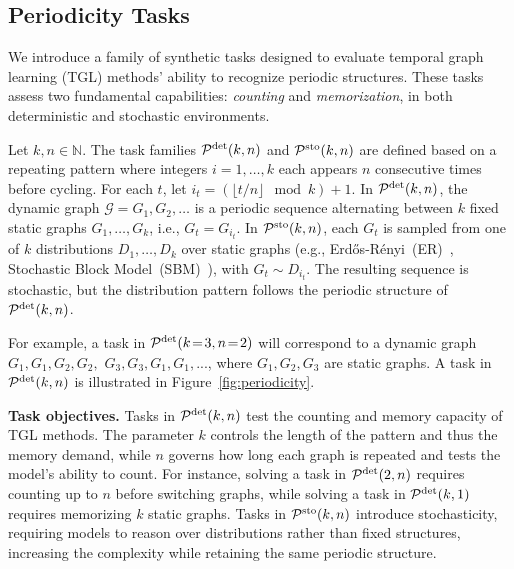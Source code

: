 
\subsection{Periodicity Tasks}\label{synth-benchmark:periodicity}

We introduce a family of synthetic tasks designed to evaluate temporal graph learning (TGL) methods' ability to recognize periodic structures. These tasks assess two fundamental capabilities: \emph{counting} and \emph{memorization}, in both deterministic and stochastic environments.




\begin{definition}
Let $k, n \in \mathbb{N}$. The task families $\mathcal{P}^\text{det}(k,n)$ and $\mathcal{P}^\text{sto}(k,n)$ are defined based on a repeating pattern where integers $i=1,\dots,k$ each appears $n$ consecutive times before cycling. For each $t$, let $i_t = (\lfloor t/n\rfloor \mod k) + 1$.
In $\mathcal{P}^\text{det}(k,n)$, the dynamic graph $\mathcal{G} = G_1, G_2, \dots$ is a periodic sequence alternating between $k$ fixed static graphs $G_1, \dots, G_k$, i.e., $G_t = G_{i_t}$.
In $\mathcal{P}^\text{sto}(k,n)$, each $G_t$ is sampled from one of $k$ distributions $D_1, \dots, D_k$ over static graphs (e.g., Erd\H{o}s-Rényi~(ER)~\cite{erdos1960evolution}, Stochastic Block Model~(SBM)~\cite{holland1983stochastic}), with $G_t \sim D_{i_t}$. The resulting sequence is stochastic, but the distribution pattern follows the periodic structure of $\mathcal{P}^\text{det}(k,n)$.
\end{definition}

For example, a task in $\mathcal{P}^\text{det}(k\!=\!3,n\!=\!2)$  will correspond to a dynamic graph $ G_1,G_1,G_2,G_2,$ $G_3,G_3,G_1,G_1,$..., where $G_1,G_2,G_3$ are static graphs. A task in $\mathcal{P}^\text{det}(k,n)$ is illustrated in Figure~\ref{fig:periodicity}.


\textbf{Task objectives.}
Tasks in $\mathcal{P}^\text{det}(k,n)$ test the counting and memory capacity of TGL methods. The parameter $k$ controls the length of the pattern and thus the memory demand, while $n$ governs how long each graph is repeated and tests the model's ability to count. For instance, solving a task in $\mathcal{P}^\text{det}(2,n)$ requires counting up to $n$ before switching graphs, while solving a task in $\mathcal{P}^\text{det}(k,1)$ requires memorizing $k$ static graphs. Tasks in $\mathcal{P}^\text{sto}(k,n)$ introduce stochasticity, requiring models to reason over distributions rather than fixed structures, increasing the complexity while retaining the same periodic structure.


